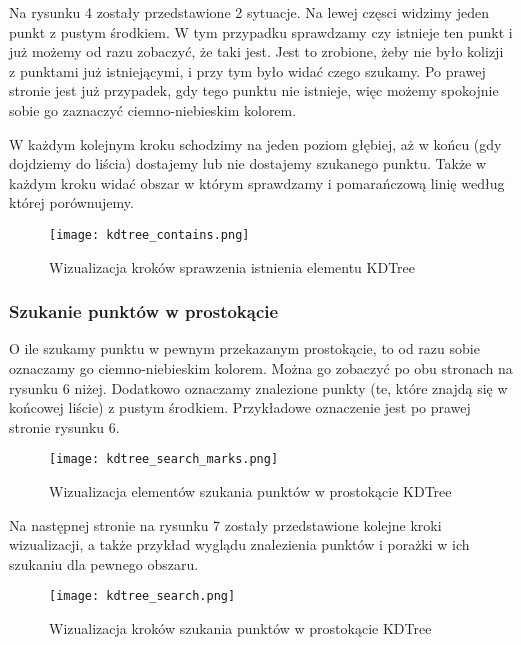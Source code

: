 \documentclass[a4paper, 12pt]{article}
\begin{document}
        \newpage

        \noindent
        \quad Na rysunku 4 zostały przedstawione 2 sytuacje. Na lewej częsci widzimy jeden punkt z pustym środkiem. W tym przypadku sprawdzamy czy istnieje ten punkt i już możemy od razu zobaczyć, że taki jest. Jest to zrobione, żeby nie było kolizji z punktami już istniejącymi, i przy tym było widać czego szukamy.
        Po prawej stronie jest już przypadek, gdy tego punktu nie istnieje, więc możemy spokojnie sobie go zaznaczyć ciemno-niebieskim kolorem.

        \noindent
        \quad W każdym kolejnym kroku schodzimy na jeden poziom głębiej, aż w końcu (gdy dojdziemy do liścia) dostajemy lub nie dostajemy szukanego punktu. Także w każdym kroku widać obszar w którym sprawdzamy i pomarańczową linię według której porównujemy.

        \begin{figure}[h!]
        \centering
          \texttt{[image: kdtree\_contains.png]}
          \caption{Wizualizacja kroków sprawzenia istnienia elementu KDTree}
        \end{figure}

      \subsubsection{Szukanie punktów w prostokącie}
        \quad O ile szukamy punktu w pewnym przekazanym prostokącie, to od razu sobie oznaczamy go ciemno-niebieskim kolorem. Można go zobaczyć po obu stronach na rysunku 6 niżej. Dodatkowo oznaczamy znalezione punkty (te, które znajdą się w końcowej liście) z pustym środkiem. Przykładowe oznaczenie jest po prawej stronie rysunku 6.

        \begin{figure}[h!]
        \centering
          \texttt{[image: kdtree\_search\_marks.png]}
          \caption{Wizualizacja elementów szukania punktów w prostokącie KDTree}
        \end{figure}

        \noindent
        \quad Na następnej stronie na rysunku 7 zostały przedstawione kolejne kroki wizualizacji, a także przykład wyglądu znalezienia punktów i porażki w ich szukaniu dla pewnego obszaru.

        \newpage

        \begin{figure}[h!]
        \centering
          \texttt{[image: kdtree\_search.png]}
          \caption{Wizualizacja kroków szukania punktów w prostokącie KDTree}
        \end{figure}
\end{document}
